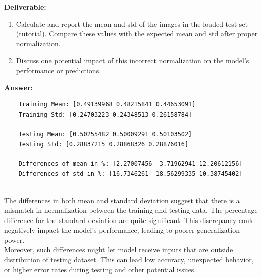 \documentclass[11pt, oneside]{article}   	%
\begin{document}
\noindent\textbf{Deliverable:}

\begin{enumerate} \item Calculate and report the mean and std of the images in the loaded test set (\href{https://stackoverflow.com/questions/73350133/how-to-calculate-mean-and-standard-deviation-of-a-set-of-images}{tutorial}). Compare these values with the expected mean and std after proper normalization.

\item Discuss one potential impact of this incorrect normalization on the model's performance or predictions. 

\end{enumerate}
\textbf{Answer:} \\
\begin{verbatim}
    Training Mean: [0.49139968 0.48215841 0.44653091]
    Training Std: [0.24703223 0.24348513 0.26158784]

    Testing Mean: [0.50255482 0.50009291 0.50103502]
    Testing Std: [0.28837215 0.28868326 0.28876016]

    Differences of mean in %: [2.27007456  3.71962941 12.20612156]
    Differences of std in %: [16.7346261  18.56299335 10.38745402]
\end{verbatim}
\\
The differences in both mean and standard deviation suggest that there is a mismatch in normalization between the training and testing data. The percentage difference for the standard deviation are quite significant.
This discrepancy could negatively impact the model's performance, leading to poorer generalization power.
\\
Moreover, such differences might let model receive inputs that are outside distribution of testing dataset. This can lead low accuracy, unexpected behavior, or higher error rates during testing and other potential issues.
\end{document}
